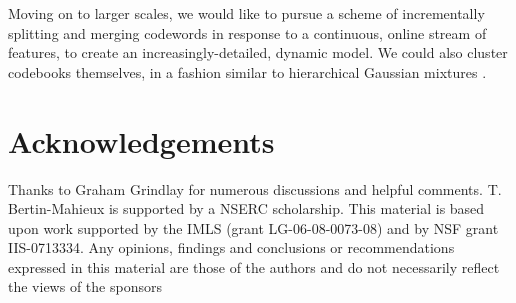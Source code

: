 \documentclass{article}
\begin{document}
Moving on to larger scales, we would like to pursue a scheme of incrementally 
splitting and merging codewords in response to a continuous, online stream 
of features, to create an increasingly-detailed, dynamic model.  We could
also cluster codebooks themselves, in a fashion similar to hierarchical
Gaussian mixtures \cite{Vasconcelos2001}.


\section{Acknowledgements}
Thanks to Graham Grindlay for numerous discussions and helpful comments.
T. Bertin-Mahieux is supported by a NSERC scholarship.
This material is based upon work supported by the IMLS (grant LG-06-08-0073-08)
and by NSF grant IIS-0713334. Any opinions, findings and
conclusions or recommendations expressed in this material are those of
the authors and do not necessarily reflect the views of the sponsors


\small

\end{document}
